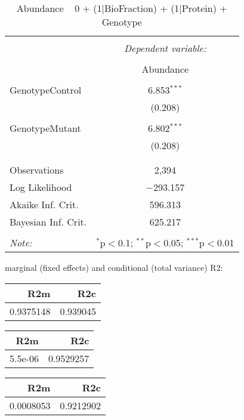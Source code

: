 \documentclass[11pt]{report}
\begin{document}
\begin{table}[!htbp] \centering 
  \caption{Abundance ~ 0 + (1|BioFraction) + (1|Protein) + Genotype} 
  \label{} 
\begin{tabular}{@{\extracolsep{5pt}}lc} 
\\[-1.8ex]\hline 
\hline \\[-1.8ex] 
 & \multicolumn{1}{c}{\textit{Dependent variable:}} \\ 
\cline{2-2} 
\\[-1.8ex] & Abundance \\ 
\hline \\[-1.8ex] 
 GenotypeControl & 6.853$^{***}$ \\ 
  & (0.208) \\ 
  & \\ 
 GenotypeMutant & 6.802$^{***}$ \\ 
  & (0.208) \\ 
  & \\ 
\hline \\[-1.8ex] 
Observations & 2,394 \\ 
Log Likelihood & $-$293.157 \\ 
Akaike Inf. Crit. & 596.313 \\ 
Bayesian Inf. Crit. & 625.217 \\ 
\hline 
\hline \\[-1.8ex] 
\textit{Note:}  & \multicolumn{1}{r}{$^{*}$p$<$0.1; $^{**}$p$<$0.05; $^{***}$p$<$0.01} \\ 
\end{tabular} 
\end{table} 
marginal (fixed effects) and conditional (total variance) R2:

\begin{tabular}{r|r}
\hline
R2m & R2c\\
\hline
0.9375148 & 0.939045\\
\hline
\end{tabular}

\begin{tabular}{r|r}
\hline
R2m & R2c\\
\hline
5.5e-06 & 0.9529257\\
\hline
\end{tabular}

\begin{tabular}{r|r}
\hline
R2m & R2c\\
\hline
0.0008053 & 0.9212902\\
\hline
\end{tabular}
\end{document}
